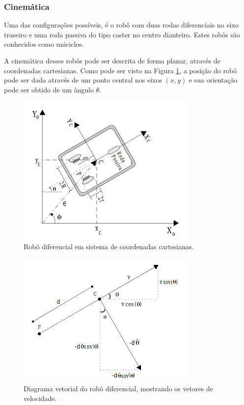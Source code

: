 \subsubsection{Cinemática}
Uma das configurações possíveis, é o robô com duas rodas diferenciais no eixo traseiro e uma roda passiva do tipo caster no centro dianteiro. Estes robôs são conhecidos como uniciclos. \cite{aicardi1995closed}
\par
A cinemática desses robôs pode ser descrita de forma planar, através de coordenadas cartesianas. Como pode ser visto na Figura \ref{fig:robo_coordenada_cart}, a posição do robô pode ser dada através de um ponto central nos eixos $(x,y)$ e sua orientação pode ser obtido de um ângulo $\theta$. \cite{sousa2003controle}
\par

\begin{figure}[ht]
    \centering
    \includegraphics[width=0.8\textwidth]{capitulos/robo_dif_coordenadas.png}
    \caption{Robô diferencial em sistema de coordenadas cartesianas. \cite{sousa2003controle}}
    \label{fig:robo_coordenada_cart}
\end{figure}
\begin{figure}[ht]
    \centering
    \includegraphics[width=0.8\textwidth]{capitulos/robo_dif_vetorial.png}
    \caption{Diagrama vetorial do robô diferencial, mostrando os vetores de velocidade. \cite{sousa2003controle}}
    \label{fig:robo_coordenada_vet}
\end{figure}
